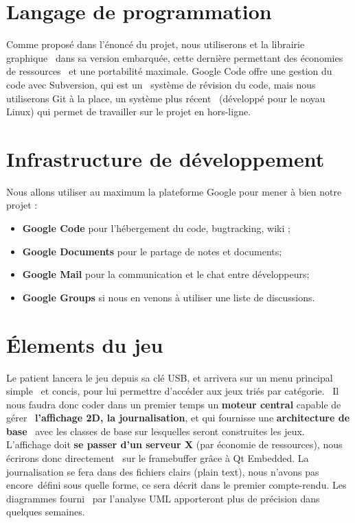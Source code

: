 \documentclass[a4paper]{article}
\begin{document}
\section{Langage de programmation}
Comme proposé dans l'énoncé du projet, nous utiliserons  et la librairie graphique\
 dans sa version embarquée, cette dernière permettant des économies de ressources \
et une portabilité maximale.
Google Code offre une gestion du code avec Subversion, qui est un \
système de révision du code, mais nous utiliserons Git à la place, un système plus récent \
(développé pour le noyau Linux) qui permet de travailler sur le projet en hors-ligne.

\section{Infrastructure de développement}
Nous allons utiliser au maximum la plateforme Google pour mener à bien notre projet :
\begin{itemize}
\item{\textbf{Google Code} pour l'hébergement du code, bugtracking, wiki ;}
\item{\textbf{Google Documents} pour le partage de notes et documents;}
\item{\textbf{Google Mail} pour la communication et le chat entre développeurs;}
\item{\textbf{Google Groups} si nous en venons à utiliser une liste de discussions.}
\end{itemize}

\section{Élements du jeu}
Le patient lancera le jeu depuis sa clé USB, et arrivera sur un menu principal simple \
et concis, pour lui permettre d'accéder aux jeux triés par catégorie. \
Il nous faudra donc coder dans un premier temps un \textbf{moteur central} capable de gérer \
\textbf{l'affichage 2D, la journalisation}, et qui fournisse une \textbf{architecture de base} \
avec les classes de base sur lesquelles seront construites les jeux.
L'affichage doit \textbf{se passer d'un serveur X} (par économie de ressources), nous écrirons donc directement \
sur le framebuffer grâce à Qt Embedded. 
La journalisation se fera dans des fichiers clairs (plain text), nous n'avons pas encore\
défini sous quelle forme, ce sera décrit dans le premier compte-rendu. Les diagrammes fourni \
par l'analyse UML apporteront plus de précision dans quelques semaines.
\end{document}
